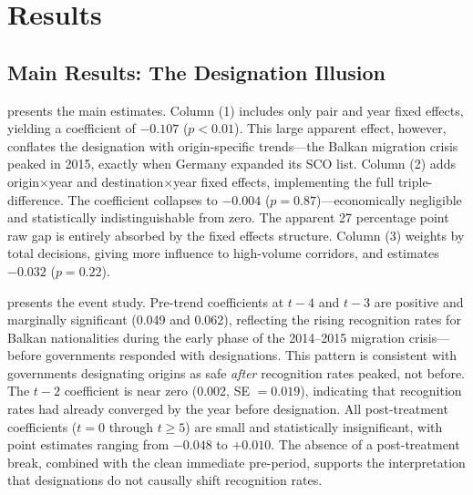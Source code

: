 \documentclass[12pt]{article}
\begin{document}
\section{Results}

\subsection{Main Results: The Designation Illusion}

 presents the main estimates. Column (1) includes only pair and year fixed effects, yielding a coefficient of $-0.107$ ($p < 0.01$). This large apparent effect, however, conflates the designation with origin-specific trends---the Balkan migration crisis peaked in 2015, exactly when Germany expanded its SCO list. Column (2) adds origin$\times$year and destination$\times$year fixed effects, implementing the full triple-difference. The coefficient collapses to $-0.004$ ($p = 0.87$)---economically negligible and statistically indistinguishable from zero. The apparent 27 percentage point raw gap is entirely absorbed by the fixed effects structure. Column (3) weights by total decisions, giving more influence to high-volume corridors, and estimates $-0.032$ ($p = 0.22$).



 presents the event study. Pre-trend coefficients at $t-4$ and $t-3$ are positive and marginally significant (0.049 and 0.062), reflecting the rising recognition rates for Balkan nationalities during the early phase of the 2014--2015 migration crisis---before governments responded with designations. This pattern is consistent with governments designating origins as safe \textit{after} recognition rates peaked, not before. The $t-2$ coefficient is near zero (0.002, SE $= 0.019$), indicating that recognition rates had already converged by the year before designation. All post-treatment coefficients ($t = 0$ through $t \geq 5$) are small and statistically insignificant, with point estimates ranging from $-0.048$ to $+0.010$. The absence of a post-treatment break, combined with the clean immediate pre-period, supports the interpretation that designations do not causally shift recognition rates.
\end{document}
